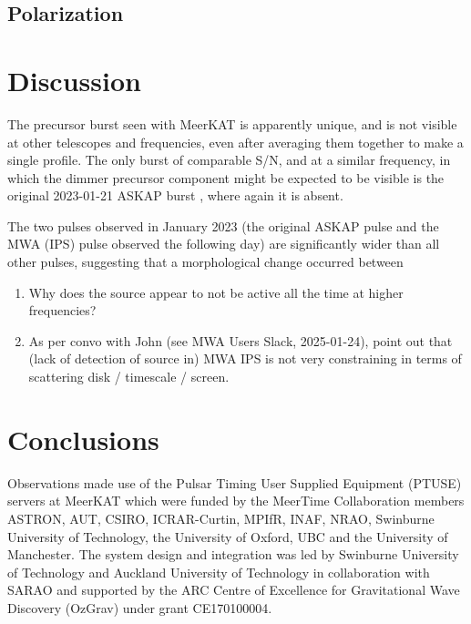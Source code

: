 \documentclass[preprint2,linenumbers]{aastex631}
\begin{document}

\subsection{Polarization} \label{sec:polarization}

\section{Discussion} \label{sec:discussion}

The precursor burst seen with MeerKAT is apparently unique, and is not visible at other telescopes and frequencies, even after averaging them together to make a single profile.
The only burst of comparable S/N, and at a similar frequency, in which the dimmer precursor component might be expected to be visible is the original 2023-01-21 ASKAP burst \citep{2024MNRAS.535..909D}, where again it is absent.

The two pulses observed in January 2023 (the original ASKAP pulse and the MWA (IPS) pulse observed the following day) are significantly wider than all other pulses, suggesting that a morphological change occurred between

\begin{enumerate}
        \item Why does the source appear to not be active all the time at higher frequencies?
              \item As per convo with John (see MWA Users Slack, 2025-01-24), point out that (lack of detection of source in) MWA IPS is not very constraining in terms of scattering disk / timescale / screen.
\end{enumerate}

\section{Conclusions} \label{sec:conclusions}

\begin{acknowledgments}

  Observations made use of the Pulsar Timing User Supplied Equipment (PTUSE) servers at MeerKAT which were funded by the MeerTime Collaboration members ASTRON, AUT, CSIRO, ICRAR-Curtin, MPIfR, INAF, NRAO, Swinburne University of Technology, the University of Oxford, UBC and the University of Manchester.  The system design and integration was led by Swinburne University of Technology and Auckland University of Technology in collaboration with SARAO and supported by the ARC Centre of Excellence for Gravitational Wave Discovery (OzGrav) under grant CE170100004.


\end{acknowledgments}
\end{document}
